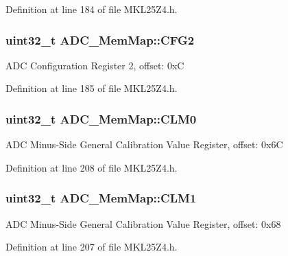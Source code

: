 Definition at line 184 of file M\+K\+L25\+Z4.\+h.

\subsubsection[{\texorpdfstring{C\+F\+G2}{CFG2}}]{\setlength{\rightskip}{0pt plus 5cm}uint32\+\_\+t A\+D\+C\+\_\+\+Mem\+Map\+::\+C\+F\+G2}\hypertarget{struct_a_d_c___mem_map_aa39dedc8da290763fa121dc4c99dc5a4}{}\label{struct_a_d_c___mem_map_aa39dedc8da290763fa121dc4c99dc5a4}
A\+DC Configuration Register 2, offset\+: 0xC 

Definition at line 185 of file M\+K\+L25\+Z4.\+h.

\subsubsection[{\texorpdfstring{C\+L\+M0}{CLM0}}]{\setlength{\rightskip}{0pt plus 5cm}uint32\+\_\+t A\+D\+C\+\_\+\+Mem\+Map\+::\+C\+L\+M0}\hypertarget{struct_a_d_c___mem_map_a1b8eeb87fa8308fe93200b6e82985c25}{}\label{struct_a_d_c___mem_map_a1b8eeb87fa8308fe93200b6e82985c25}
A\+DC Minus-\/\+Side General Calibration Value Register, offset\+: 0x6C 

Definition at line 208 of file M\+K\+L25\+Z4.\+h.

\subsubsection[{\texorpdfstring{C\+L\+M1}{CLM1}}]{\setlength{\rightskip}{0pt plus 5cm}uint32\+\_\+t A\+D\+C\+\_\+\+Mem\+Map\+::\+C\+L\+M1}\hypertarget{struct_a_d_c___mem_map_a6c07d3719b54b23926239b53919f36d2}{}\label{struct_a_d_c___mem_map_a6c07d3719b54b23926239b53919f36d2}
A\+DC Minus-\/\+Side General Calibration Value Register, offset\+: 0x68 

Definition at line 207 of file M\+K\+L25\+Z4.\+h.

